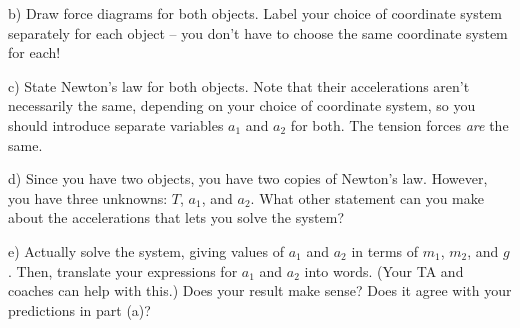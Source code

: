 \documentclass[12pt]{article}
\begin{document}
		b) Draw force diagrams for both objects. Label your choice of coordinate system separately for each object -- you don't have to choose the same coordinate system for each!
		
		\vspace{2in}
		
		c) State Newton's law for both objects. Note that their accelerations aren't necessarily the same, depending on your choice of coordinate system, so you should introduce separate variables $a_1$ and $a_2$ for both. The tension forces
		{\it are} the same.
		
		\newpage
		
		d) Since you have two objects, you have two copies of Newton's law. However, you have three unknowns: $T$, $a_1$, and $a_2$. What other statement can you make about the accelerations that lets you solve the system?
		
		\vspace{3in}
		
		e) Actually solve the system, giving values of $a_1$ and $a_2$ in terms of $m_1$, $m_2$, and $g$. Then, translate
		your expressions for $a_1$ and $a_2$ into words. (Your TA and coaches can help with this.) Does your result make sense?
		Does it agree with your predictions in part (a)?
		
	
\end{document}
